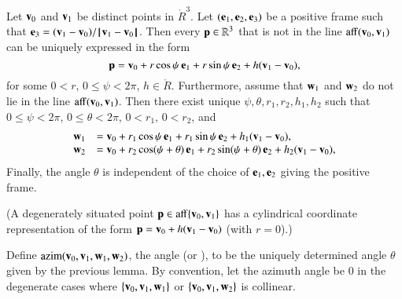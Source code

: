 \begin{lemma}
Let ${\mathbf v}_0$ and ${\mathbf v}_1$ be distinct points in 
$\ring{R}^3$.  Let $({\mathbf e}_1,{\mathbf e}_2,{\mathbf e}_3)$ be a positive frame 
such that $\e_3 = (\v_1-\v_0)/\norm{\v_1}{\v_0}$.
Then every
${\mathbf p}\in\mathbb{R}^3$ that is not in the line ${\operatorname{aff}}({\mathbf v}_0,{\mathbf v}_1)$
can be uniquely expressed in the form
\begin{displaymath}
{\mathbf p} = {\mathbf v}_0 + r\cos\psi\, {\mathbf e}_1 + r\sin\psi\, {\mathbf e}_2 + h ({\mathbf v}_1-{\mathbf v}_0),
\end{displaymath}
%
%
for some $0< r$, $0\le \psi < 2\pi$, $h\in\ring{R}$.
Furthermore,
assume that ${\mathbf w}_1$ and ${\mathbf w}_2$ do
not lie in the line ${\operatorname{aff}}({\mathbf v}_0,{\mathbf v}_1)$.
Then there exist unique $\psi,\theta,r_1,r_2,h_1,h_2$
such
that $0\le\psi<2\pi$, $0\le\theta < 2\pi$, $0 < r_1$, $0 < r_2$, and
\begin{displaymath}
\begin{array}{lll}
{\mathbf w}_1 &= {\mathbf v}_0 + r_1\cos\psi\, {\mathbf e}_1 + r_1\sin\psi\, {\mathbf e}_2 + h_1({\mathbf v}_1-{\mathbf v}_0),\\
{\mathbf w}_2 &= {\mathbf v}_0 + r_2\cos(\psi+\theta)\, {\mathbf e}_1 + r_2\sin(\psi+\theta)\, {\mathbf e}_2 
+ h_2({\mathbf v}_1-{\mathbf v}_0),\\
\end{array}
\end{displaymath}
Finally, the angle $\theta$ is independent of the choice of ${\mathbf e}_1,{\mathbf e}_2$
giving the positive frame.
\end{lemma}
%
%
%
%
%
%
(A degenerately situated point ${\mathbf p}\in{\operatorname{aff}}\{{\mathbf v}_0,{\mathbf v}_1\}$ has a
cylindrical coordinate representation of the form ${\mathbf p} = {\mathbf v}_0 +
h({\mathbf v}_1-{\mathbf v}_0)$ (with $r=0$).)


%

\begin{definition}[azim]
  Define ${\operatorname{azim}}({\mathbf v}_0,{\mathbf v}_1,{\mathbf w}_1,{\mathbf w}_2)$, the  angle
  (or ), to be the uniquely determined angle
  $\theta$  given by the previous lemma.
  By convention, let the azimuth angle be $0$ in the degenerate cases
  where $\{{\mathbf v}_0,{\mathbf v}_1,{\mathbf w}_1\}$ or $\{{\mathbf v}_0,{\mathbf v}_1,{\mathbf w}_2\}$ is collinear.
\end{definition}


